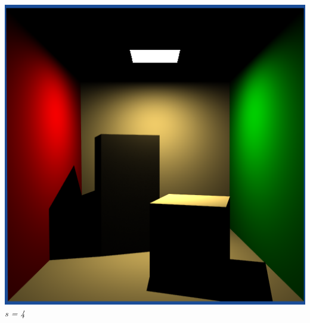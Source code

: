 \documentclass[a4,12pt]{article}
\begin{document}
\begin{center}
\begin{minipage}[b]{0.40\linewidth}
\begin{center}
				\includegraphics[width = \textwidth]{./Worksheet6/cornellblocks4.png}\\
				\textit{s = 4}
			\end{center}
		\end{minipage}
	\end{center}
	
\end{document}
